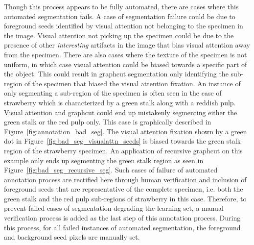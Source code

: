\documentclass {udthesis}
\begin{document}
Though this process appears to be fully automated, there are cases where this automated segmentation fails. A case of segmentation failure could be due to foreground seeds identified by visual attention not belonging to the specimen in the image. Visual attention not picking up the specimen could be due to the presence of other \emph{interesting} artifacts in the image that bias visual attention away from the specimen. There are also cases where the texture of the specimen is not uniform, in which case visual attention could be biased towards a specific part of the object. This could result in graphcut segmentation only identifying the sub-region of the specimen that biased the visual attention fixation. An instance of only segmenting a sub-region of the specimen is often seen in the case of strawberry which is characterized by a green stalk along with a reddish pulp. Visual attention and graphcut could end up mistakenly segmenting either the green stalk or the red pulp only. This case is graphically described in Figure~\ref{fig:annotation_bad_seg}. The visual attention fixation shown by a green dot in Figure~\ref{fig:bad_seg_visualattn_seeds} is biased towards the green stalk region of the strawberry specimen. An application of recursive graphcut on this example only ends up segmenting the green stalk region as seen in Figure~\ref{fig:bad_seg_recursive_seg}. Such cases of failure of automated annotation process are rectified here through human verification and inclusion of foreground seeds that are representative of the complete specimen, i.e. both the green stalk and the red pulp sub-regions of strawberry in this case. Therefore, to prevent failed cases of segmentation degrading the learning set, a manual verification process is added as the last step of this annotation process. During this process, for all failed instances of automated segmentation, the foreground and background seed pixels are manually set. 
%
\end{document}
